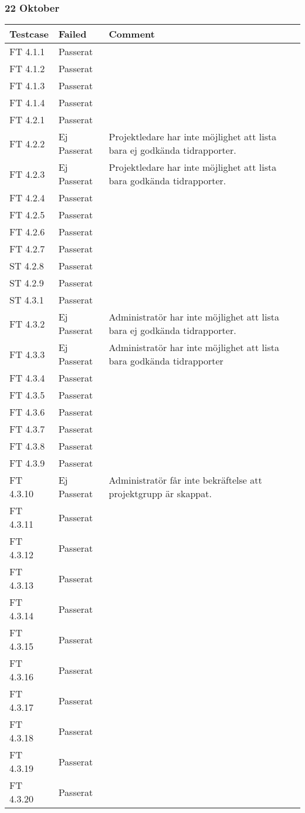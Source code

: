 \documentclass[a4paper]{article}
\begin{document}
\subsubsection{22 Oktober}
\begin{tabular}{| l | l | p{11cm} |}
\hline
Testcase &  Failed & Comment\\
\hline
FT 4.1.1 & Passerat & \\
\hline
FT 4.1.2 & Passerat & \\
\hline
FT 4.1.3 & Passerat & \\
\hline
FT 4.1.4 & Passerat & \\
\hline
FT 4.2.1 & Passerat & \\
\hline
FT 4.2.2 & Ej Passerat & Projektledare har inte möjlighet att lista bara ej godkända tidrapporter.\\
\hline
FT 4.2.3 & Ej Passerat & Projektledare har inte möjlighet att lista bara godkända tidrapporter.\\
\hline
FT 4.2.4 & Passerat & \\
\hline
FT 4.2.5 & Passerat & \\
\hline
FT 4.2.6 & Passerat & \\
\hline
FT 4.2.7 & Passerat & \\
\hline
ST 4.2.8 & Passerat & \\
\hline
ST 4.2.9 & Passerat & \\
\hline
ST 4.3.1 & Passerat & \\
\hline
FT 4.3.2 & Ej Passerat & Administratör har inte möjlighet att lista bara ej godkända tidrapporter. \\
\hline
FT 4.3.3 & Ej Passerat & Administratör har inte möjlighet att lista bara godkända tidrapporter\\
\hline
FT 4.3.4 & Passerat & \\
\hline
FT 4.3.5 & Passerat & \\
\hline
FT 4.3.6 & Passerat & \\
\hline
FT 4.3.7 & Passerat & \\
\hline
FT 4.3.8 & Passerat & \\
\hline
FT 4.3.9 & Passerat & \\
\hline
FT 4.3.10 & Ej Passerat & Administratör får inte bekräftelse att projektgrupp är skappat. \\
\hline
FT 4.3.11 & Passerat & \\
\hline
FT 4.3.12 & Passerat & \\
\hline
FT 4.3.13 & Passerat & \\
\hline
FT 4.3.14 & Passerat & \\
\hline
FT 4.3.15 & Passerat & \\
\hline
FT 4.3.16 & Passerat & \\
\hline
FT 4.3.17 & Passerat & \\
\hline
FT 4.3.18 & Passerat & \\
\hline
FT 4.3.19 & Passerat & \\
\hline
FT 4.3.20 & Passerat & \\
\end{tabular}
\end{document}
